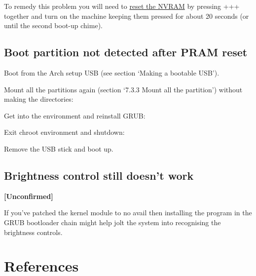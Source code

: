 To remedy this problem you will need to \href{https://support.apple.com/en-us/HT204063}{reset the NVRAM} by pressing +++ together and turn on the machine keeping them pressed for about 20 seconds (or until the second boot-up chime).

\subsection{Boot partition not detected after PRAM reset}

Boot from the Arch setup USB (see section `Making a bootable USB').

Mount all the partitions again (section `7.3.3 Mount all the partition') without making the directories:


Get into the  environment and reinstall GRUB:


Exit chroot environment and shutdown:


Remove the USB stick and boot up.

\subsection{Brightness control still doesn't work}

\textbf{\textcolor{textgrey}{[Unconfirmed]}}

If you've patched the  kernel module to no avail then installing the \href{https://github.com/0xbb/apple\_set_os.efi}{} program in the GRUB bootloader chain might help jolt the system into recognising the brightness controls.

\clearpage
\section{References}

